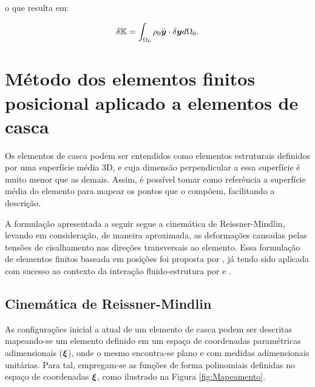 \noindent o que resulta em:

\begin{equation}
    \delta\mathbb{K}=\int_{\Omega_0}{\rho_0\ddot{\boldsymbol{y}}\cdot\delta\boldsymbol{y}d\Omega_0}\text{.}
\end{equation}

\section{Método dos elementos finitos posicional aplicado a elementos de casca} \label{MEFP}

Os elementos de casca podem ser entendidos como elementos estruturais definidos por uma superfície média 3D, e cuja dimensão perpendicular a essa superfície é muito menor que as demais. Assim, é possível tomar como referência a superfície média do elemento para mapear os pontos que o compõem, facilitando a descrição.

A formulação apresentada a seguir segue a cinemática de Reissner-Mindlin, levando em consideração, de maneira aproximada, as deformações causadas pelas tensões de cisalhamento nas direções transversais ao elemento. Essa formulação de elementos finitos baseada em posições foi proposta por , já tendo sido aplicada com sucesso ao contexto da interação fluido-estrutura por  e .

\subsection{Cinemática de Reissner-Mindlin}

As configurações inicial a atual de um elemento de casca podem ser descritas mapeando-se um elemento definido em um espaço de coordenadas paramétricas adimensionais ($\boldsymbol{\xi}$), onde o mesmo encontra-se plano e com medidas adimensionais unitárias. Para tal, empregam-se as funções de forma polinomiais definidas no espaço de coordenadas $\boldsymbol{\xi}$, como ilustrado na Figura \ref{fig:Mapeamento}.


